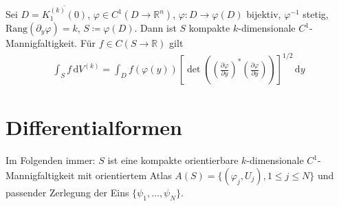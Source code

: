 \documentclass[a4paper,10pt]{scrbook}
\begin{document}

\begin{example} \label{thm:11.7}
  Sei $D = \overline{K_1^{(k)}(0)}$, $\varphi \in C^1(D \to \mathbb{R}^n)$, $\varphi : D \to \varphi(D)$ bijektiv, $\varphi^{-1}$ stetig, $\mathrm{Rang}(\partial_y \varphi) = k$, $S \coloneq \varphi(D)$. Dann ist $S$ kompakte $k$-dimensionale $C^1$-Mannigfaltigkeit. Für $f \in C(S \to \mathbb{R})$ gilt
  \begin{align*}
    \int_S f \, \mathrm{d}V^{(k)} = \int_D f(\varphi(y)) \left[ \det \left( \left( \frac{\partial \varphi}{\partial y} \right)^* \left( \frac{\partial \varphi}{\partial y} \right) \right) \right]^{1/2} \, \mathrm{d}y
  \end{align*}
\end{example}

%
%

\section{Differentialformen}
\addtocounter{thmn}{1}
\setcounter{theorem}{0}


\begin{theorem}[Vereinbarung] \label{thm:12.1}
  Im Folgenden immer: $S$ ist eine kompakte orientierbare $k$-dimensionale $C^1$-Mannigfaltigkeit mit orientiertem Atlas $A(S) = \{ (\varphi_j,U_j) , 1 \leq j \leq N \}$ und passender Zerlegung der Eins $\{ \psi_1,\ldots,\psi_N \}$.
\end{theorem}
\end{document}
